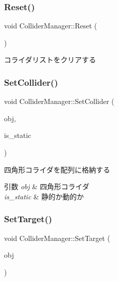 \subsubsection{\texorpdfstring{Reset()}{Reset()}}
{\footnotesize\ttfamily void Collider\+Manager\+::\+Reset (\begin{DoxyParamCaption}{ }\end{DoxyParamCaption})}



コライダリストをクリアする 

\mbox{\label{class_collider_manager_acf6822be802b18cd2f0ea50b2ba00d63}} 
\subsubsection{\texorpdfstring{Set\+Collider()}{SetCollider()}}
{\footnotesize\ttfamily void Collider\+Manager\+::\+Set\+Collider (\begin{DoxyParamCaption}\item[{\mbox{\hyperlink{class_square_collider}{Square\+Collider}} $\ast$}]{obj,  }\item[{bool}]{is\+\_\+static }\end{DoxyParamCaption})}



四角形コライダを配列に格納する 


\begin{DoxyParams}{引数}
{\em obj} & 四角形コライダ \\
\hline
{\em is\+\_\+static} & 静的か動的か \\
\hline
\end{DoxyParams}
\mbox{\label{class_collider_manager_a197aed04295d1118fe7bc0be935b9a47}} 
\subsubsection{\texorpdfstring{Set\+Target()}{SetTarget()}}
{\footnotesize\ttfamily void Collider\+Manager\+::\+Set\+Target (\begin{DoxyParamCaption}\item[{\mbox{\hyperlink{class_object_base}{Object\+Base}} $\ast$}]{obj }\end{DoxyParamCaption})\hspace{0.3cm}{\ttfamily [inline]}}




